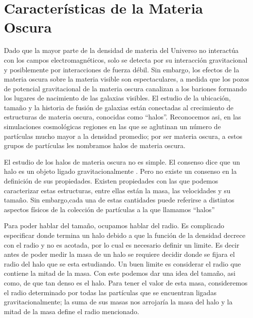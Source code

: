 \section{Características de la Materia Oscura}

Dado que la mayor parte de la densidad de materia del Universo no interactúa con los campos electromagnéticos, solo se detecta por su interacción gravitacional y posiblemente por interacciones de fuerza débil. Sin embargo, los efectos de la materia oscura sobre la materia visible son espectaculares, a medida que los pozos de potencial gravitacional de la materia oscura canalizan a los bariones formando los lugares de nacimiento de las galaxias visibles. El estudio de la ubicación, tamaño y la historia de fusión de galaxias están conectadas al crecimiento de estructuras de materia oscura, conocidas como ``halos''. {\blues Reconocemos asi, en las simulaciones cosmológicas regiones en las que se aglutinan un número de partículas mucho mayor a la densidad promedio; por ser materia oscura, a estos grupos de partículas les nombramos halos de materia oscura.}

El estudio de los halos de materia oscura no es simple.  El consenso dice que un halo es un objeto ligado gravitacionalmente \cite{2011MNRAS.415.2293K}. Pero no existe un consenso en la definición de sus propiedades. Existen propiedades con las que podemos caracterizar estas estructuras, entre ellas están la masa, las velocidades y su tamaño. Sin embargo,cada una de estas cantidades puede referirse a distintos aspectos físicos de la colección de partículas a la que llamamos ``halos''

Para poder hablar del tamaño, ocupamos hablar del radio. Es complicado especificar donde termina un halo debido a que la función de la densidad decrece con el radio y no es acotada, por lo cual es necesario definir un limite. {\blues Es decir antes de poder medir la masa de un halo se requiere decidir donde se fijara el radio del halo que se esta estudiando.} Un buen limite es considerar el radio que contiene la mitad de la masa. Con este podemos dar una idea del tamaño, asi como, de que tan denso es el halo. {\blues Para tener el valor de esta masa, consideremos el radio determinado por todas las partículas que se encuentran ligadas gravitacionalmente; la suma de sus masas nos arrojaría la masa del halo y la mitad de la masa define el radio mencionado.}

